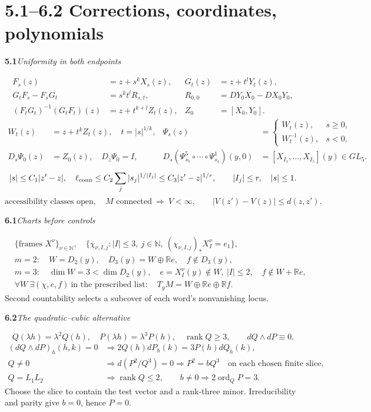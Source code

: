 \documentclass[11pt]{article}
\newcommand{\R}{\mathbb R}
\newcommand{\N}{\mathbb N}
\newcommand{\rk}{\operatorname{rank}}
\newcommand{\rowhead}[2]{\par\medskip\noindent\textbf{#1}\quad\textit{#2}\par}
\newcommand{\newpart}[1]{\clearpage\section*{#1}}
\begin{document}
\newpart{5.1--6.2 \quad Corrections, coordinates, polynomials}
\rowhead{5.1}{Uniformity in \emph{both} endpoints}
\begin{align*}
 F_s(z)&=z+s^kX_s(z),& G_t(z)&=z+t^lY_t(z),\\
 G_tF_s-F_sG_t&=s^kt^l R_{s,t},& R_{0,0}&=DY_0X_0-DX_0Y_0,\\
 (F_tG_t)^{-1}(G_tF_t)(z)&=z+t^{k+l}Z_t(z),&
 Z_0&=[X_0,Y_0] .
\end{align*}
\begin{align*}
 W_t(z)&=z+t^kZ_t(z),\quad t=|s|^{1/k},&
 \Psi_s(z)&=\begin{cases}W_t(z),&s\ge0,\\W_t^{-1}(z),&s<0,\end{cases}\\
 D_s\Psi_0(z)&=Z_0(z),\quad D_z\Psi_0=I,&
 D_s(\Psi^{5}_{s_5}\circ\cdots\circ\Psi^{1}_{s_1})(y,0)&=[X_{I_1},\ldots,X_{I_5}](y)\in GL_5.
\end{align*}
\[
 |s|\le C_1|z'-z|,\quad \ell_{\rm conn}\le C_2\sum_j |s_j|^{1/|I_j|}
 \le C_3|z'-z|^{1/r},\qquad |I_j|\le r,\quad |s|\le1 .
\]
\[
 \text{accessibility classes open},\quad M\text{ connected}
 \ \Longrightarrow\ V<\infty,\qquad |V(z')-V(z)|\le d(z,z') .
\]
\rowhead{6.1}{Charts before controls}
\begin{align*}
 &\{\text{frames }X^\nu\}_{\nu\in\N},\quad
  \big\{\chi_{\nu,I,j}: |I|\le3,\ j\in\N,\ 
              (\chi_{\nu,I,j})_*X_I^\nu=e_1\big\},\\
 &m=2:\quad W=D_2(y),\quad D_3(y)=W\oplus\R e,\quad
                f\notin D_3(y),\\
 &m=3:\quad \dim W=3<\dim D_2(y),\quad
                e=X_I^\nu(y)\notin W,\ |I|\le2,\quad f\notin W+\R e,\\
 &\forall W\ \exists(\chi,e,f)\ \text{in the prescribed list}:
                 \quad T_yM=W\oplus\R e\oplus\R f .
\end{align*}
Second countability selects a subcover of each word's nonvanishing locus.
\rowhead{6.2}{The quadratic--cubic alternative}
\[
 Q(\lambda h)=\lambda^2Q(h),\quad P(\lambda h)=\lambda^3P(h),\quad
 \rk Q\ge3,\qquad dQ\wedge dP\equiv0 .
\]
\begin{align*}
 (dQ\wedge dP)_h(h,k)=0
 &\Longrightarrow 2Q(h)dP_h(k)=3P(h)dQ_h(k),\\
 Q\ne0&\Longrightarrow d(P^2/Q^3)=0
 \Longrightarrow P^2=bQ^3\quad\text{on each chosen finite slice},\\
 Q=L_1L_2&\Longrightarrow\rk Q\le2,\qquad
 b\ne0\Longrightarrow 2\operatorname{ord}_{Q}P=3 .
\end{align*}
Choose the slice to contain the test vector and a rank-three minor.
Irreducibility and parity give $b=0$, hence $P=0$.
\end{document}
